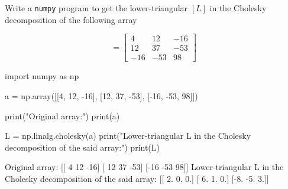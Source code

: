 \cprotEnv\begin{question}
Write a \texttt{numpy} program to get the lower-triangular $[L]$ in the Cholesky decomposition of the following array

\begin{equation*}
	[A] = \begin{bmatrix}
		4& 12 & -16\\
		12& 37 & -53\\
		-16& -53 & 98
	\end{bmatrix}
\end{equation*}
\end{question}

\cprotEnv\begin{solution}
\begin{ipython}
import numpy as np

a = np.array([[4, 12, -16], [12, 37, -53], [-16, -53, 98]])

print("Original array:")
print(a)

L = np.linalg.cholesky(a)
print("Lower-triangular L in the Cholesky decomposition of the said array:")
print(L)
\end{ipython}
\begin{ioutput}
Original array:
[[  4  12 -16]
 [ 12  37 -53]
 [-16 -53  98]]
Lower-triangular L in the Cholesky decomposition of the said array:
[[ 2.  0.  0.]
 [ 6.  1.  0.]
 [-8. -5.  3.]]
\end{ioutput}
\end{solution}